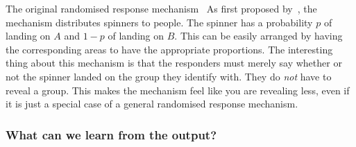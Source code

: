 \begin{theoryblock}{The original randomised response mechanism~\cite{werner:1965}}
  As first proposed by~\citeauthor{werner:1965}, the mechanism distributes spinners to people. The spinner has a probability $p$ of landing on $A$ and $1 - p$ of landing on $B$. This can be easily arranged by having the corresponding areas to have the appropriate proportions. The interesting thing about this mechanism is that the responders must merely say whether or not the spinner landed on the group they identify with. They do \emph{not} have to reveal a group. This makes the mechanism feel like you are revealing less, even if it is just a special case of a general randomised response mechanism.
\end{theoryblock}

\begin{frame}
  \frametitle{What can we learn from the output?}

\end{frame}
